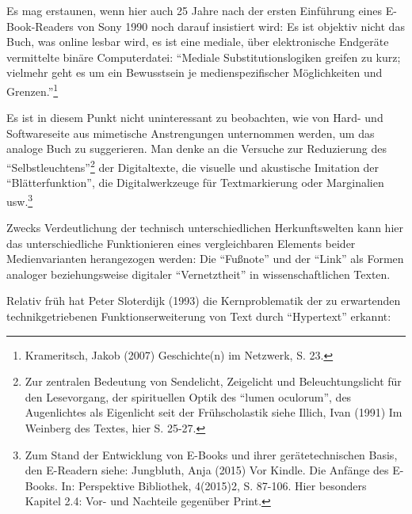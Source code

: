 \documentclass[a4paper,
fontsize=11pt,
oneside,
numbers=noperiodatend,
parskip=half-,
bibliography=totoc,
final
]{scrartcl}
\begin{document}
Es mag erstaunen, wenn hier auch 25 Jahre nach der ersten Einführung
eines E-Book-Readers von Sony 1990 noch darauf insistiert wird: Es ist
objektiv nicht das Buch, was online lesbar wird, es ist eine mediale,
über elektronische Endgeräte vermittelte binäre Computerdatei:
\enquote{Mediale Substitutionslogiken greifen zu kurz; vielmehr geht es
um ein Bewusstsein je medienspezifischer Möglichkeiten und
Grenzen.}\footnote{Krameritsch, Jakob (2007) Geschichte(n) im Netzwerk,
  S. 23.}

Es ist in diesem Punkt nicht uninteressant zu beobachten, wie von Hard-
und Softwareseite aus mimetische Anstrengungen unternommen werden, um
das analoge Buch zu suggerieren. Man denke an die Versuche zur
Reduzierung des \enquote{Selbstleuchtens}\footnote{Zur zentralen
  Bedeutung von Sendelicht, Zeigelicht und Beleuchtungslicht für den
  Lesevorgang, der spirituellen Optik des \enquote{lumen oculorum}, des
  Augenlichtes als Eigenlicht seit der Frühscholastik siehe Illich, Ivan
  (1991) Im Weinberg des Textes, hier S. 25-27.} der Digitaltexte, die
visuelle und akustische Imitation der \enquote{Blätterfunktion}, die
Digitalwerkzeuge für Textmarkierung oder Marginalien usw.\footnote{Zum
  Stand der Entwicklung von E-Books und ihrer gerätetechnischen Basis,
  den E-Readern siehe: Jungbluth, Anja (2015) Vor Kindle. Die Anfänge
  des E-Books. In: Perspektive Bibliothek, 4(2015)2, S. 87-106. Hier
  besonders Kapitel 2.4: Vor- und Nachteile gegenüber Print.}

Zwecks Verdeutlichung der technisch unterschiedlichen Herkunftswelten
kann hier das unterschiedliche Funktionieren eines vergleichbaren
Elements beider Medienvarianten herangezogen werden: Die
\enquote{Fußnote} und der \enquote{Link} als Formen analoger
beziehungsweise digitaler \enquote{Vernetztheit} in wissenschaftlichen
Texten.

Relativ früh hat Peter Sloterdijk (1993) die Kernproblematik der zu
erwartenden technikgetriebenen Funktionserweiterung von Text durch
\enquote{Hypertext} erkannt:
\end{document}
